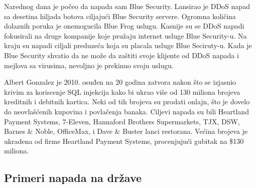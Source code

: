 \documentclass[a4paper]{article}
\theoremstyle{break}
\begin{document}
{\begin{description}
Narednog dana je počeo da napada sam Blue Security. Lansirao je DDoS napad sa desetina hiljada botova ciljajući Blue Security servere. Ogromna količina dolaznih poruka je onemogucila Blue Frog uslugu. Kasnije su se DDoS napadi fokusirali na druge kompanije koje pružaju internet usluge Blue Security-u. Na kraju su napadi ciljali preduzeća koja su placala usluge Blue Seciruty-u. Kada je Blue Security shvatio da ne može da zaštiti svoje klijente od DDoS napada i mejlova sa virusima, nevoljno je prekinuo svoju uslugu.


\item[ALBERT GONZALEZ] Albert Gonzalez je 2010. osuđen na 20 godina zatvora nakon što se izjasnio krivim za koriscenje SQL injekcija kako bi ukrao više od 130 miliona brojeva kreditnih i debitnih kartica. Neki od tih brojeva su prodati onlajn, što je dovelo do neovlašćenih kupovina i povlačenja banaka. Ciljevi napada su bili Heartland Payment Systems,  7-Eleven,  Hannaford Brothers Supermarkets,  TJX,  DSW,  Barnes \& Noble, OfficeMax, i Dave \& Buster lanci restorana. Većina brojeva je ukradena od firme Heartland Payment Systems, procenjujući gubitak na \$130 miliona.
\end{description}

\subsection{Primeri napada na države}
\label{subsec:primeri_napada_drzave}

}
\end{document}
